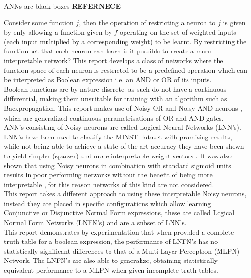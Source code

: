 ANNs are black-boxes \textbf{REFERNECE}








Consider some function $f$, then the operation of restricting a neuron to $f$ is given by only allowing a function given by $f$ operating on the set of weighted inputs (each input multiplied by a corresponding weight) to be learnt. By restricting the function set that each neuron can learn is it possible to create a more interpretable network? This report develops a class of networks where the function space of each neuron is restricted to be a predefined operation which can be interpreted as Boolean expression i.e. an AND or OR of its inputs.\\

Boolean functions are by nature discrete, as such do not have a continuous differential, making them unsuitable for training with an algorithm such as Backpropagation. This report makes use of Noisy-OR and Noisy-AND neurons \cite{LearningLogicalActivations}, which are generalized continuous parametrisations of OR and AND gates.\\

ANN's consisting of Noisy neurons are called Logical Neural Networks (LNN's). LNN's have been used to classify the MINST dataset with promising results, while not being able to achieve a state of the art accuracy they have been shown to yield simpler (sparser) and more interpretable weight vectors \cite{LearningLogicalActivations}. It was also shown that using Noisy neurons in combination with standard sigmoid units results in poor performing networks without the benefit of being more interpretable \cite{LearningLogicalActivations}, for this reason networks of this kind are not considered.\\

This report takes a different approach to using these interpretable Noisy neurons, instead they are placed in specific configurations which allow learning Conjunctive or Disjunctive Normal Form expressions, these are called Logical Normal Form Networks (LNFN's) and are a subset of LNN's.\\

This report demonstrates by experimentation that when provided a complete truth table for a boolean expression, the performance of LNFN's has no statistically significant differences to that of a Multi-Layer Perceptron (MLPN) Network. The LNFN's are also able to generalize, obtaining statistically equivalent performance to a MLPN when given incomplete truth tables.\\

